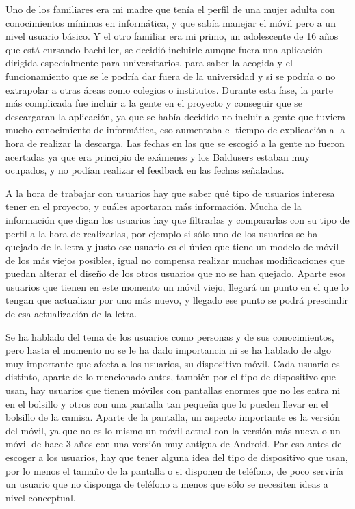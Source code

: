Uno de los familiares era mi madre que tenía el perfil de una mujer adulta con conocimientos mínimos en informática, y que sabía manejar el móvil pero a un nivel usuario básico.
Y el otro familiar era mi primo, un adolescente de 16 años que está cursando bachiller, se decidió incluirle aunque fuera una aplicación dirigida especialmente para universitarios, para saber la acogida y el funcionamiento que se le podría dar fuera de la universidad y si se podría o no extrapolar a otras áreas como colegios o institutos.
Durante esta fase, la parte más complicada fue incluir a la gente en el proyecto y conseguir que se descargaran la aplicación, ya que se había decidido no incluir a gente que tuviera mucho conocimiento de informática, eso aumentaba el tiempo de explicación a la hora de realizar la descarga.
Las fechas en las que se escogió a la gente no fueron acertadas ya que era principio de exámenes y los Baldusers estaban muy ocupados, y no podían realizar el feedback en las fechas señaladas.

A la hora de trabajar con usuarios hay que saber qué tipo de usuarios interesa tener en el proyecto, y cuáles aportaran más información.
Mucha de la información que digan los usuarios hay que filtrarlas y compararlas con su tipo de perfil a la hora de realizarlas, por ejemplo si sólo uno de los usuarios se ha quejado de la letra y justo ese usuario es el único que tiene un modelo de móvil de los más viejos posibles, igual no compensa realizar muchas modificaciones que puedan alterar el diseño de los otros usuarios que no se han quejado. Aparte esos usuarios que tienen en este momento un móvil viejo, llegará un punto en el que lo tengan que actualizar por uno más nuevo, y llegado ese punto se podrá prescindir de esa actualización de la letra.

Se ha hablado del tema de los usuarios como personas y de sus conocimientos, pero hasta el momento no se le ha dado importancia ni se ha hablado de algo muy importante que afecta a los usuarios, su dispositivo móvil. 
Cada usuario es distinto, aparte de lo mencionado antes, también por el tipo de dispositivo que usan, hay usuarios que tienen móviles con pantallas enormes que no les entra ni en el bolsillo y otros con una pantalla tan pequeña que lo pueden llevar en el bolsillo de la camisa.
Aparte de la pantalla, un aspecto importante es la versión del móvil, ya que no es lo mismo un móvil actual con la versión más nueva o un móvil de hace 3 años con una versión muy antigua de Android.
Por eso antes de escoger a los usuarios, hay que tener alguna idea del tipo de dispositivo que usan, por lo menos el tamaño de la pantalla o si disponen de teléfono, de poco serviría un usuario que no disponga de teléfono a menos que sólo se necesiten ideas a nivel conceptual.




